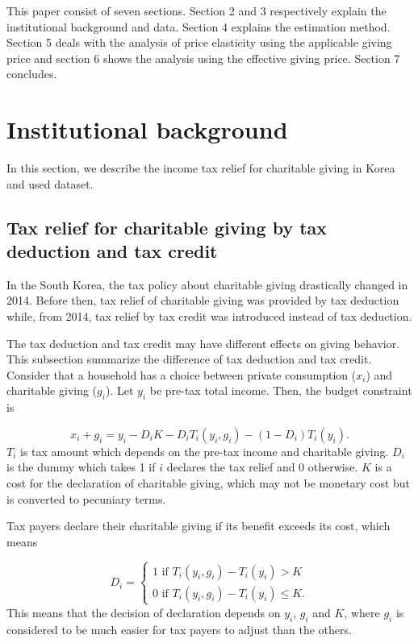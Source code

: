 \documentclass[
  11pt,
  a4paper,
]{article}
\begin{document}
This paper consist of seven sections. Section 2 and 3 respectively explain the institutional background and data. Section 4 explains the estimation method. Section 5 deals with the analysis of price elasticity using the applicable giving price and section 6 shows the analysis using the effective giving price. Section 7 concludes.

\hypertarget{institutional-background}{%
\section{Institutional background}\label{institutional-background}}

In this section, we describe the income tax relief for charitable giving in Korea and used dataset.

\hypertarget{tax-relief-for-charitable-giving-by-tax-deduction-and-tax-credit}{%
\subsection{Tax relief for charitable giving by tax deduction and tax credit}\label{tax-relief-for-charitable-giving-by-tax-deduction-and-tax-credit}}

In the South Korea, the tax policy about charitable giving drastically changed in 2014. Before then, tax relief of charitable giving was provided by tax deduction while, from 2014, tax relief by tax credit was introduced instead of tax deduction.

The tax deduction and tax credit may have different effects on giving behavior. This subsection summarize the difference of tax deduction and tax credit.
Consider that a household has a choice between private consumption (\(x_i\)) and charitable giving (\(g_i\)). Let \(y_i\) be pre-tax total income.
Then, the budget constraint is

\[
    x_i + g_i = y_i − D_iK - D_iT_i(y_i, g_i) - (1-D_i)T_i(y_i).
\]
\(T_i\) is tax amount which depends on the pre-tax income and charitable giving.
\(D_i\) is the dummy which takes 1 if \(i\) declares the tax relief and 0 otherwise. \(K\) is a cost for the declaration of charitable giving, which may not be monetary cost but is converted to pecuniary terms.

Tax payers declare their charitable giving if its benefit exceeds its cost, which means

\[
D_i=\begin{cases}
1 \text{ if }T_i(y_i, g_i) - T_i(y_i)>K\\
0 \text{ if }T_i(y_i, g_i) - T_i(y_i)\le K.
\end{cases}
\]
This means that the decision of declaration depends on \(y_i\), \(g_i\) and \(K\), where \(g_i\) is considered to be much easier for tax payers to adjust than the others.
\end{document}
